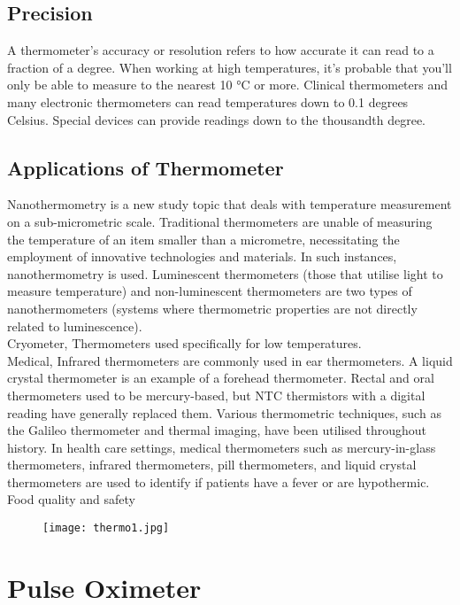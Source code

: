 \documentclass[12pt]{article}
\begin{document}
\subsection{Precision}
A thermometer's accuracy or resolution refers to how accurate it can read to a fraction of a degree. When working at high temperatures, it's probable that you'll only be able to measure to the nearest 10 °C or more. Clinical thermometers and many electronic thermometers can read temperatures down to 0.1 degrees Celsius. Special devices can provide readings down to the thousandth degree.
\\
\subsection{Applications of Thermometer}
Nanothermometry is a new study topic that deals with temperature measurement on a sub-micrometric scale. Traditional thermometers are unable of measuring the temperature of an item smaller than a micrometre, necessitating the employment of innovative technologies and materials. In such instances, nanothermometry is used. Luminescent thermometers (those that utilise light to measure temperature) and non-luminescent thermometers are two types of nanothermometers (systems where thermometric properties are not directly related to luminescence).
\\
Cryometer, Thermometers used specifically for low temperatures.
\\
Medical, Infrared thermometers are commonly used in ear thermometers.
A liquid crystal thermometer is an example of a forehead thermometer.
Rectal and oral thermometers used to be mercury-based, but NTC thermistors with a digital reading have generally replaced them. Various thermometric techniques, such as the Galileo thermometer and thermal imaging, have been utilised throughout history. In health care settings, medical thermometers such as mercury-in-glass thermometers, infrared thermometers, pill thermometers, and liquid crystal thermometers are used to identify if patients have a fever or are hypothermic. Food quality and safety
\\
\begin{figure}[h]
\centering
\texttt{[image: thermo1.jpg]}
\label{fig_thermo1}
\end{figure}
\clearpage
\section{Pulse Oximeter}
\end{document}
